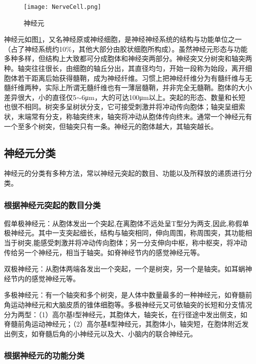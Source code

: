 \documentclass[a4paper,10pt]{article}\large
\begin{document}
\begin{figure}[htb]
\centering

\par \hspace{2ex}
\texttt{[image: NerveCell.png]}
\caption{神经元}\label{fig 2} 
\end{figure}


神经元\cite{18:book}如图\ref{fig 2}，又名神经原或神经细胞，是神经神经系统的结构与功能单位之一（占了神经系统约10\%，其他大部分由胶状细胞所构成）。虽然神经元形态与功能多种多样，但结构上大致都可分成胞体和神经突两部分。神经突又分树突和轴突两种。轴突往往很长，由细胞的轴丘分出，其直径均匀，开始一段称为始段，离开细胞体若干距离后始获得髓鞘，成为神经纤维。习惯上把神经纤维分为有髓纤维与无髓纤维两种，实际上所谓无髓纤维也有一薄层髓鞘，并非完全无髓鞘。胞体的大小差异很大，小的直径仅5$\sim$6μm，大的可达100μm以上。突起的形态、数量和长短也很不相同。树突多呈树状分支，它可接受刺激并将冲动传向胞体；轴突呈细索状，末端常有分支，称轴突终末，轴突将冲动从胞体传向终末。通常一个神经元有一个至多个树突，但轴突只有一条。神经元的胞体越大，其轴突越长。

\subsection{神经元分类}

神经元的分类有多种方法，常以神经元突起的数目、功能以及所释放的递质进行分类。

\subsubsection{根据神经元突起的数目分类}

 
假单极神经元：从胞体发出一个突起,在离胞体不远处呈T型分为两支,因此,称假单极神经元。其中一支突起细长，结构与轴突相同，伸向周围，称周围突，其功能相当于树突,能感受刺激并将冲动传向胞体；另一分支伸向中枢，称中枢突，将冲动传给另一个神经元，相当于轴突。如脊神经节内的感觉神经元等。


双极神经元：从胞体两端各发出一个突起，一个是树突，另一个是轴突。如耳蜗神经节内的感觉神经元等。


多极神经元：有一个轴突和多个树突，是人体中数量最多的一种神经元，如脊髓前角运动神经元和大脑皮质的锥体细胞等。多极神经元又可依轴突的长短和分支情况分为两型：（1）高尔基Ⅰ型神经元，其胞体大，轴突长，在行径途中发出侧支，如脊髓前角运动神经元；（2）高尔基Ⅱ型神经元，其胞体小，轴突短，在胞体附近发出例支，如脊髓后角的小神经元以及大、小脑内的联合神经元。


\subsubsection{根据神经元的功能分类}
\end{document}

